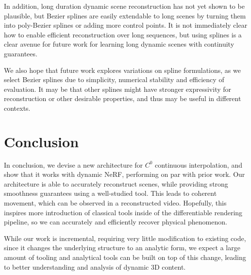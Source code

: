 In addition, long duration dynamic scene reconstruction has not yet shown to be plausible, but Bezier splines are easily extendable to long scenes by turning them into poly-Bezier splines or adding more control points. It is not immediately clear how to enable efficient reconstruction over long sequences, but using splines is a clear avenue for future work for learning long dynamic scenes with continuity guarantees.

We also hope that future work explores variations on spline formulations, as we select
Bezier splines due to simplicity, numerical stability and efficiency of evaluation. It may be that other splines might have stronger expressivity for reconstruction or other desirable properties, and thus may be useful in different contexts.

\section*{Conclusion}

In conclusion, we devise a new architecture for $C^0$ continuous interpolation, and show that it works with dynamic NeRF, performing on par with prior work.
Our architecture is able to accurately reconstruct scenes, while providing strong smoothness guarantees using a well-studied tool. This leads to coherent movement, which can be observed in a reconstructed video. Hopefully, this inspires more introduction of classical tools inside of the differentiable rendering pipeline, so we can accurately and efficiently recover physical phenomenon.

While our work is incremental, requiring very little modification to existing code, since it changes the underlying structure to an analytic form, we expect a large amount of tooling and analytical tools can be built on top of this change, leading to better understanding and analysis of dynamic 3D content.

\iffalse
\section*{Acknowledgements}

Thanks to Elliot Cuzzillo and Seung-Hwan Baek for helping proofread this work.
\fi